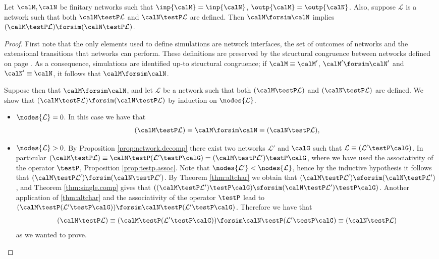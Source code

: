 \documentclass{LMCS}
\newcommand{\calL}{\ensuremath{{\mathcal{L}}}}
\begin{document}
\begin{cor}\label{cor:composition}
Let $\calM, \calN$ be finitary networks such that $
\inp{\calM} = \inp{\calN}$, $\outp{\calM} = \outp{\calN}$. 
Also, suppose $\calL$ is a network such that both 
$\calM \testP \calL$ and $\calN \testP \calL$ are defined. 
Then $\calM \forsim  \calN$ implies  
$(\calM \testP \calL)  \forsim (\calN \testP \calL)$.
\end{cor}
\begin{proof}
 First note that the only elements used to define simulations 
 are network interfaces, the set of outcomes of networks and the extensional 
 transitions that networks can perform. These definitions are preserved by the structural congruence between networks
defined on page \pageref{sec:properties}.
 As a  consequence, 
 simulations are identified up-to structural congruence; 
 if $\calM \equiv \calM'$, $\calM' \forsim \calN'$ and 
 $\calN' \equiv \calN$, it follows that $\calM \forsim \calN$.
 
 Suppose then that $\calM \forsim \calN$, and let $\calL$ be 
 a network such that both $(\calM \testP \calL)$ and $(\calN \testP 
 \calL)$ are defined. We show that 
 $(\calM \testP \calL) \forsim (\calN \testP \calL)$ by induction on 
 $\nodes{\calL}$.
 \begin{itemize}
 \item $\nodes{\calL} = 0$. In this case we have that 
 \[ 
 (\calM \testP \calL) \equiv \calM \forsim \calN \equiv (\calN \testP \calL),
 \]
 \item $\nodes{\calL} > 0$. By Proposition \ref{prop:network.decomp} 
there exist two networks $\calL'$ and $\calG$ such that 
$\calL \equiv (\calL' \testP \calG)$. 
In particular $(\calM \testP \calL) \equiv \calM \testP (\calL' \testP \calG) = 
(\calM \testP \calL') \testP \calG$, where we have used the associativity 
of the operator $\testP$, Proposition \ref{prop:testp.assoc}. 
Note that $\nodes{\calL'} < \nodes{\calL}$, hence by the inductive 
hypothesis it follows that $(\calM \testP \calL') \forsim (\calN \testP \calL')$. 
By Theorem \ref{thm:altchar} we obtain that $(\calM \testP \calL') \sforsim (\calN \testP \calL')$, 
and Theorem \ref{thm:single.comp} gives that 
$((\calM \testP \calL') \testP \calG) \sforsim (\calN \testP \calL') \testP \calG)$.
 Another application of \ref{thm:altchar} and the associativity of the operator $\testP$ lead to 
 $(\calM \testP( \calL' \testP \calG)) \forsim \calN \testP (\calL' \testP \calG)$. 
 Therefore we have that 
 \[
 (\calM \testP \calL) \equiv (\calM \testP( \calL' \testP \calG)) \forsim \calN \testP (\calL' \testP \calG)
 \equiv (\calN \testP \calL)
 \]
 as we wanted to prove.\qedhere
 \end{itemize}
\end{proof}
\end{document}
